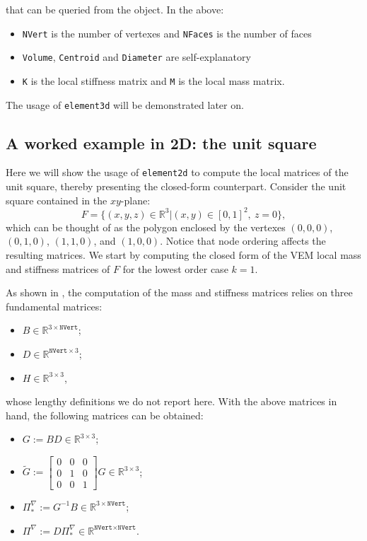 \documentclass[a4paper]{article}
\begin{document}
\noindent
that can be queried from the object. In the above:
\begin{itemize}
\item \texttt{NVert} is the number of vertexes and \texttt{NFaces} is the number of faces
\item \texttt{Volume}, \texttt{Centroid} and \texttt{Diameter} are self-explanatory
\item \texttt{K} is the local stiffness matrix and \texttt{M} is the local mass matrix.
\end{itemize}

\noindent
The usage of \texttt{element3d} will be demonstrated later on.

\subsection{A worked example in 2D: the unit square}
Here we will show the usage of \texttt{element2d} to compute the local matrices of the unit square, thereby presenting the closed-form counterpart. Consider the unit square contained in the $xy$-plane:
\begin{equation}
F = \{(x,y,z) \in \mathbb{R}^3 | (x,y) \in [0,1]^2, \ z = 0\},
\end{equation}
which can be thought of as the polygon enclosed by the vertexes $(0, 0, 0)$, $(0, 1, 0)$, $(1,1, 0)$, and $(1, 0, 0)$.  Notice that node ordering affects the resulting matrices.  We start by computing the closed form of the VEM local mass and stiffness matrices of $F$ for the lowest order case $k=1$.

\noindent
As shown in \cite{hitchhikers}, the computation of the mass and stiffness matrices relies on three fundamental matrices:
\begin{itemize}
\item $B \in \mathbb{R}^{3\times\texttt{NVert}}$;
\item $D \in \mathbb{R}^{\texttt{NVert} \times 3}$;
\item $H \in\mathbb{R}^{3\times 3}$,
\end{itemize}
whose lengthy definitions we do not report here. With the above matrices in hand, the following matrices can be obtained:
\begin{itemize}
\item $G := BD \in\mathbb{R}^{3\times 3}$;
\item $\widetilde{G} := \left[\begin{array}{ccc}
0 & 0 & 0\\ 0 & 1 & 0 \\ 0 & 0 & 1
\end{array}\right] G \in\mathbb{R}^{3\times 3}$;
\item $\Pi^\nabla_* := G^{-1}B \in \mathbb{R}^{3\times\texttt{NVert}}$;
\item $\Pi^\nabla := D\Pi^\nabla_* \in \mathbb{R}^{\texttt{NVert}\times\texttt{NVert}}$.
\end{itemize}
\end{document}
